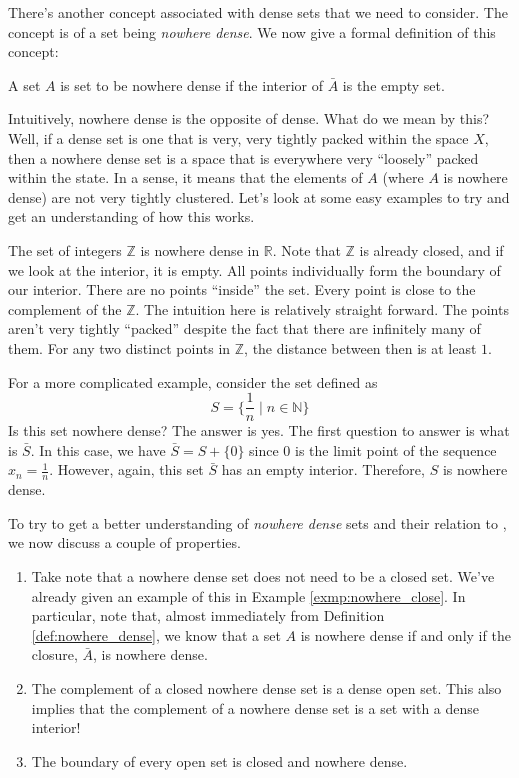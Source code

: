\documentclass[english, 11pt]{article}
\begin{document}
  There's another concept associated with dense sets that we need to consider. The concept is of a set being \textit{nowhere dense}. We now give a formal definition of this concept:

  \begin{defn}
  \label{def:nowhere_dense}
  A set $A$ is set to be nowhere dense if the interior of $\bar{A}$ is the empty set.
  \end{defn}

  Intuitively, nowhere dense is the opposite of dense. What do we mean by this? Well, if a dense set is one that is very, very tightly packed within the space $X$, then a nowhere dense set is a space that is everywhere very ``loosely'' packed within the state. In a sense, it means that the elements of $A$ (where $A$ is nowhere dense) are not very tightly clustered. Let's look at some easy examples to try and get an understanding of how this works.

  \begin{exmp}
   The set of integers $\mathbb{Z}$ is nowhere dense in $\mathbb{R}$. Note that $\mathbb{Z}$ is already closed, and if we look at the interior, it is empty. All points individually form the boundary of our interior. There are no points ``inside'' the set. Every point is close to the complement of the $\mathbb{Z}$. The intuition here is relatively straight forward. The points aren't very tightly ``packed'' despite the fact that there are infinitely many of them. For any two distinct points in $\mathbb{Z}$, the distance between then is at least $1$.
  \end{exmp}

  \begin{exmp}
  \label{exmp:nowhere_close}
  For a more complicated example, consider the set defined as
  $$
    S = \{ \frac{1}{n} \mid n \in \mathbb{N} \}
  $$
  Is this set nowhere dense? The answer is yes. The first question to answer is what is $\bar{S}$. In this case, we have $\bar{S} = S + \{0\}$ since $0$ is the limit point of the sequence $x_n = \frac{1}{n}$. However, again, this set $\bar{S}$ has an empty interior. Therefore, $S$ is nowhere dense.
  \end{exmp}

  To try to get a better understanding of \textit{nowhere dense} sets and their relation to , we now discuss a couple of properties.\\

  \begin{enumerate}
    \item Take note that a nowhere dense set does not need to be a closed set. We've already given an example of this in Example \ref{exmp:nowhere_close}. In particular, note that, almost immediately from Definition \ref{def:nowhere_dense}, we know that a set $A$ is nowhere dense if and only if the closure, $\bar{A}$, is nowhere dense.
    \item The complement of a closed nowhere dense set is a dense open set. This also implies that the complement of a nowhere dense set is a set with a dense interior!
    \item The boundary of every open set is closed and nowhere dense.
  \end{enumerate}
\end{document}
